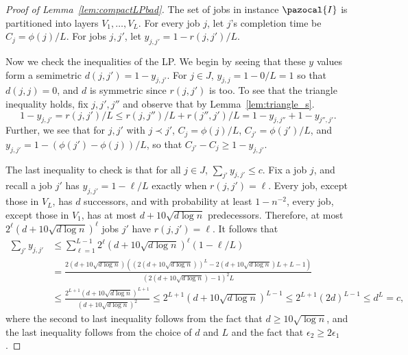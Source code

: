 \begin{proof}[Proof of Lemma~\ref{lem:compactLPbad}]
The set of jobs in instance $\pazocal{I}$ is partitioned into layers $V_1,\ldots,V_L$. For every job $j$, let $j$'s completion time be $C_j = \phi(j)/L$.
For jobs $j,j'$, let $y_{j,j'} = 1-r(j,j')/L$.

Now we check the inequalities of the LP.
We begin by seeing that these $y$ values form a semimetric $d(j,j') = 1-y_{j,j'}$. 
For $j \in J$, $y_{j,j} = 1-0/L=1$ so that $d(j,j)=0$, and $d$ is symmetric since $r(j,j')$ is too. To see that the triangle inequality holds, fix $j,j',j''$ and observe that by Lemma~\ref{lem:triangle_s}.
$$
    1-y_{j,j'} = r(j,j')/L \leq r(j,j'')/L + r(j'',j')/L =  1-y_{j,j''}+ 1-y_{j'',j'}.
$$
Further, we see that for $j,j'$ with $j \prec j'$, $C_j = \phi(j)/L$, $C_{j'} = \phi(j')/L$, and $y_{j,j'} =  1-(\phi(j') - \phi(j))/L$, so that $C_{j'} - C_j \geq 1-y_{j,j'}$. 

The last inequality to check is that for all $j \in J$, $\sum_{j'}y_{j,j'} \leq c$. 
Fix a job $j$, and recall a job $j'$ has $y_{j,j'} = 1-\ell/L$ exactly when $r(j,j')=\ell$. 
Every job, except those in $V_L$, has $d$ successors, and with probability at least $1-n^{-2}$, every job, except those in $V_1$, has at most $d + 10\sqrt{d \log n}$ predecessors. 
Therefore, at most $2^\ell (d+10\sqrt{d \log n})^\ell$ jobs $j'$ have $r(j,j')=\ell$. It follows that 
\begin{align*}
        \sum_{j'} y_{j,j'} &\leq \sum_{\ell =1}^{L-1} 2^{\ell} (d+10\sqrt{d \log n})^{\ell}(1-\ell/L)\\
        &= \frac{2(d+10\sqrt{d \log n})((2(d+10\sqrt{d \log n}))^L-2(d+10\sqrt{d \log n})L+L-1)}{(2(d+10\sqrt{d \log n})-1)^2L} \\
    &\leq \frac{2^{L+1}(d+10\sqrt{d \log n})^{L+1}}{(d+10\sqrt{d \log n})^2}
    \leq 2^{L+1}(d+10\sqrt{d \log n})^{L-1}
    \leq 2^{L+1}(2d)^{L-1}
    \leq d^L=c,
\end{align*}
where the second to last inequality follows from the fact that $d \geq 10 \sqrt{\log n}$, 
and the last inequality follows from the choice of $d$ and $L$ and the fact that $\epsilon_2 \geq 2\epsilon_1$.




\end{proof}




